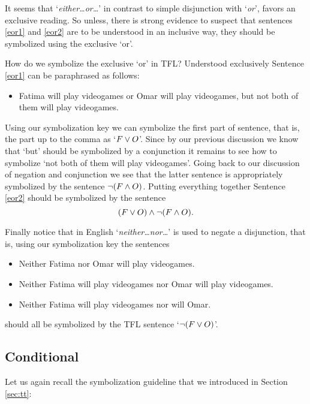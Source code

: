 It seems that `\emph{either\ldots or\ldots}' in contrast to simple disjunction with `\emph{or}', favors an exclusive reading. So unless, there is strong evidence to suspect that sentences \ref{eor1} and \ref{eor2} are to be understood in an inclusive way, they should be symbolized using the exclusive `or'.

How do we symbolize the exclusive `or' in TFL? Understood exclusively Sentence \ref{eor1} can be paraphrased as follows:
\begin{itemize}
\item Fatima will play videogames or Omar will play videogames, but not both of them will play videogames.
\end{itemize}
Using our symbolization key we can symbolize the first part of sentence, that is, the part up to the comma as `$F\vee O$'. Since by our previous discussion we know  that `but' should be symbolized by a conjunction it remains to see how to symbolize `not both of them will play videogames'. Going back to our discussion of negation and conjunction we see that the latter sentence is appropriately symbolized by the sentence $\neg(F\mathbin{\wedge} O)$. Putting everything together Sentence \ref{eor2} should be symbolized by the sentence $$(F\vee O)\mathbin{\wedge}\neg(F\mathbin{\wedge} O).$$


Finally notice that in English `\emph{neither\ldots nor\ldots}' is used to negate a disjunction, that is, using our symbolization key the sentences
\begin{itemize}
\item Neither Fatima nor Omar will play videogames.
\item Neither Fatima will play videogames nor Omar will play videogames.
\item  Neither Fatima will play videogames nor will Omar.
\end{itemize}
should all be symbolized by the TFL sentence `$\neg(F\vee O)$'.



\subsection{Conditional}
Let us again recall the symbolization guideline that we introduced in Section \ref{sec:tt}:


